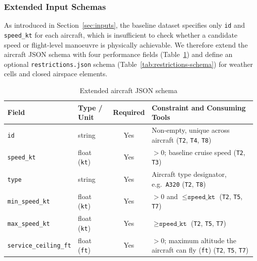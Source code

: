 \subsubsection{Extended Input Schemas}\label{sec:input-schemas}

As introduced in Section~\ref{sec:inputs}, the baseline dataset specifies only \texttt{id} and \texttt{speed\_kt} for each aircraft, which is insufficient to check whether a candidate speed or flight-level manoeuvre is physically achievable. We therefore extend the aircraft JSON schema with four performance fields (Table~\ref{tab:aircraft-schema}) and define an optional \texttt{restrictions.json} schema (Table~\ref{tab:restrictions-schema}) for weather cells and closed airspace elements.

\begin{table}[H]
\centering
\caption{Extended aircraft JSON schema}
\label{tab:aircraft-schema}
\footnotesize
\setlength{\tabcolsep}{4pt}
\begin{tabularx}{\linewidth}{@{}l l c >{\raggedright\arraybackslash}X@{}}
\toprule
\textbf{Field} & \textbf{Type / Unit} & \textbf{Required} & \textbf{Constraint and Consuming Tools} \\
\midrule
\texttt{id}                 & string          & Yes & Non-empty, unique across aircraft (\texttt{T2}, \texttt{T4}, \texttt{T8}) \\
\texttt{speed\_kt}          & float (\texttt{kt}) & Yes & $> 0$; baseline cruise speed (\texttt{T2}, \texttt{T3}) \\
\texttt{type}               & string          & Yes & Aircraft type designator, e.g.\ \texttt{A320} (\texttt{T2}, \texttt{T8}) \\
\texttt{min\_speed\_kt}     & float (\texttt{kt}) & Yes & $> 0$ and $\le \texttt{speed\_kt}$ (\texttt{T2}, \texttt{T5}, \texttt{T7}) \\
\texttt{max\_speed\_kt}     & float (\texttt{kt}) & Yes & $\ge \texttt{speed\_kt}$ (\texttt{T2}, \texttt{T5}, \texttt{T7}) \\
\texttt{service\_ceiling\_ft} & float (\texttt{ft}) & Yes & $> 0$; maximum altitude the aircraft can fly (\texttt{ft}) (\texttt{T2}, \texttt{T5}, \texttt{T7}) \\
\bottomrule
\end{tabularx}
\end{table}

